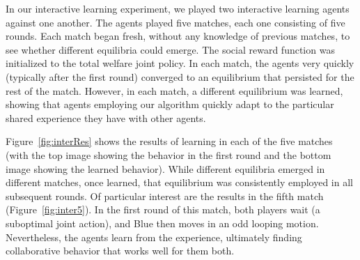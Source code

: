 In our interactive learning experiment,
we played two interactive learning agents against one another.  The
agents played five matches, each one consisting of five rounds.  Each
match began fresh, without any knowledge of previous matches, to see
whether different equilibria could emerge.  The social reward function was
initialized to the total welfare joint policy.  In each match, the
agents very quickly (typically after the first round) converged to an
equilibrium that persisted for the rest of the match.  However, in each
match, a different equilibrium was learned, showing that agents employing our
algorithm quickly adapt to the particular shared experience they have
with other agents.

Figure~\ref{fig:interRes} shows the results of learning in each of the
five matches (with the top image showing the behavior in the first
round and the bottom image showing the learned behavior). While
different equilibria emerged in different matches, once learned, that
equilibrium was consistently employed in all subsequent rounds.  Of
particular interest are the results in the fifth match
(Figure~\ref{fig:inter5}). In the first round of this match, both
players wait (a suboptimal joint action), and Blue then moves in an
odd looping motion. Nevertheless, the agents learn from the experience,
ultimately finding collaborative behavior that works well for them both.

